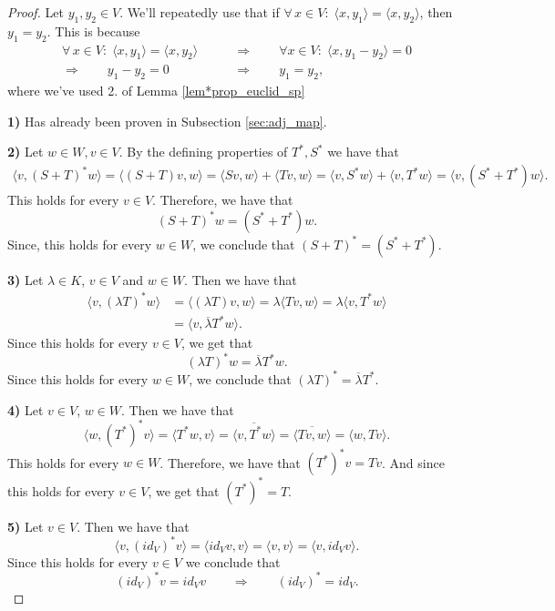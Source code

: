 \begin{proof}
	Let $y_1, y_2 \in V$. We'll repeatedly use that if $ \forall \, x  \in V:\;\langle x, y_1\rangle = \langle x, y_2\rangle$, then $y_1 = y_2$. This is because 
	\begin{align*}
		\forall \, x \in V :\;\langle x, y_1\rangle = \langle x, y_2\rangle \qquad &\Longrightarrow \qquad \forall x \in V :\; \langle x, y_1 - y_2\rangle = 0\\
		\Longrightarrow \qquad y_1 - y_2 = 0 \qquad &\Longrightarrow \qquad y_1 = y_2,
	\end{align*}
	where we've used 2. of Lemma \ref{lem*prop_euclid_sp}
	
	\textbf{1)} Has already been proven in Subsection \ref{sec:adj_map}.
	
	\textbf{2)} Let $w \in W, v \in V$. By the defining properties of $T^*, S^*$ we have that
	\begin{align*}
		\langle v, (S + T)^*w \rangle = \langle (S + T)v, w \rangle = \langle Sv, w\rangle + \langle Tv, w\rangle
		= \langle v, S^*w \rangle + \langle v, T^*w\rangle = \langle v, (S^* + T^*)w\rangle.
	\end{align*}
	This holds for every $v \in V$. Therefore, we have that
	\[
		(S+T)^*w = (S^* + T^*)w.
	\]
	Since, this holds for every $w \in W$, we conclude that $(S+T)^* = (S^* + T^*)$.
	
	
	\textbf{3)} Let $\lambda \in K$, $v \in V$ and $w \in W$. Then we have that
	\begin{align*}
		\langle v, (\lambda T)^* w\rangle &= \langle (\lambda T)v, w\rangle = \lambda \langle Tv, w\rangle = \lambda \langle v, T^*w\rangle\\
		&= \langle v, \overline{\lambda}T^*w\rangle.
	\end{align*}
	Since this holds for every $v \in V$, we get that
	\[
		(\lambda T)^*w = \overline{\lambda}T^*w.
	\]
	Since this holds for every $w \in W$, we conclude that $(\lambda T)^* = \overline{\lambda}T^*$.
	
	\textbf{4)} Let $v \in V$, $w \in W$. Then we have that
	\[
		\langle w, (T^*)^*v\rangle = \langle T^*w, v \rangle = \overline{\langle v, T^*w\rangle} = \overline{\langle Tv, w\rangle} = \langle w, Tv\rangle.
	\]
	This holds for every $w \in W$. Therefore, we have that $(T^*)^*v = Tv$. And since this holds for every $v \in V$, we get that $(T^*)^* = T$.
	
	\textbf{5)} Let $v \in V$. Then we have that
	\[
		\langle v, (id_V)^*v\rangle = \langle id_V v, v\rangle = \langle v, v\rangle = \langle v , id_V v \rangle.
	\]
	Since this holds for every $v \in V$ we conclude that
	\[
		(id_V)^*v = id_V v \qquad \Longrightarrow \qquad (id_V)^* = id_V.
	\]
	

\end{proof}
